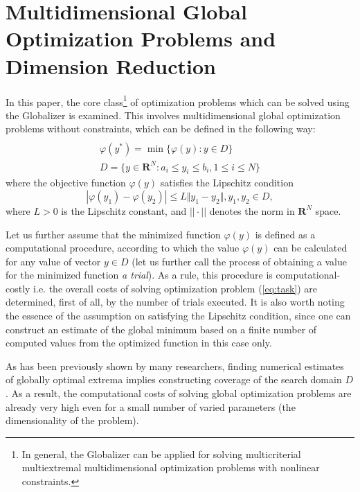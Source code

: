 \documentclass{gOMS2e}
\theoremstyle{plain}%
\theoremstyle{definition}
\theoremstyle{remark}
\begin{document}
\section{Multidimensional Global Optimization Problems and Dimension Reduction}
\label{sec:problem}
In this paper, the core class\footnote{In general, the Globalizer can be applied for solving
multicriterial multiextremal multidimensional optimization problems with nonlinear constraints.} of
optimization problems which can be solved using the
Globalizer is examined. This involves multidimensional global optimization problems
without constraints, which can be defined in the following way:
\begin{equation}
\label{eq:task}
\begin{array}{cr}\\
  \varphi(y^*)=\min\{\varphi(y):y\in D\} \\
  D=\{y\in \mathbf{R}^N:a_i\leqslant y_i\leqslant{b_i}, 1\leqslant{i}\leqslant{N}\}
\end{array}
\end{equation}
where the objective function \(\varphi(y)\) satisfies the Lipschitz condition
\begin{equation}
\label{eq:lip}
|\varphi(y_1)-\varphi(y_2)|\leqslant L\Vert y_1-y_2\Vert,y_1,y_2\in D,
\end{equation}
where \(L>0\) is the Lipschitz constant, and \(||\cdot||\) denotes the norm in \(\mathbf{R}^N\) space.
\par
Let us further assume that the minimized function \(\varphi(y)\) is defined as a
computational procedure, according to which the value \(\varphi(y)\) can be calculated
for any value of vector \(y\in D\) (let us further call the process of obtaining a
value for the minimized function \textit{a trial}). As a rule, this procedure is computational-costly i.e.
the overall costs of solving optimization problem (\ref{eq:task}) are determined,
first of all, by the number of trials executed. It is also worth noting the essence of the
assumption on satisfying the Lipschitz condition, since one can construct an estimate
of the global minimum based on a finite number of computed values from the optimized function in this case only.
\par
As has been previously shown by many researchers, finding numerical estimates of globally
optimal extrema implies constructing coverage of the search domain \(D\). As a result,
the computational costs of solving global optimization problems are already very high
even for a small number of varied parameters (the dimensionality of the problem).
\end{document}
